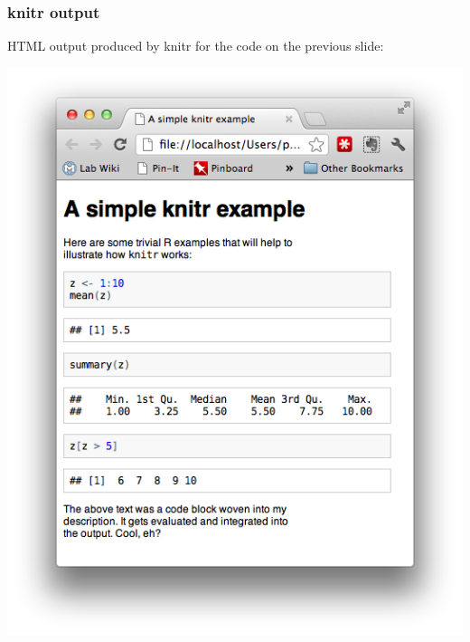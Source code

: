 \documentclass{beamer}
\begin{document}
\begin{frame}
  \frametitle{knitr output}

HTML output produced by knitr for the code on the previous slide:
%
\begin{center}
\includegraphics[width=.65\textwidth]{knitr-ex1-screenshot.png}
\end{center}


\end{frame}
\end{document}
